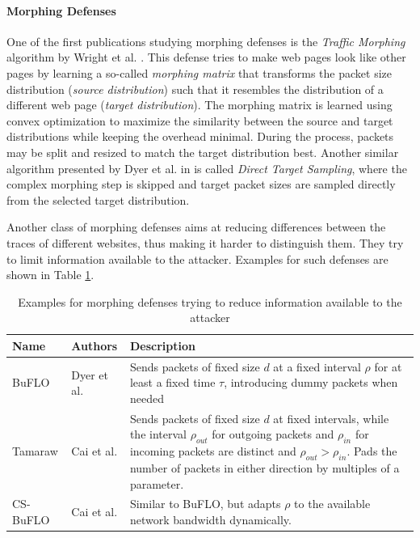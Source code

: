 \documentclass[
	ruledheaders=chapter,
	class=report,
	thesis={type=master, department=inf},
	accentcolor=1c,
	custommargins=true,
	marginpar=false,
	parskip=half-,
	fontsize=11pt,
]{tudapub}
\begin{document}
	\paragraph{Morphing Defenses} One of the first publications studying morphing defenses is the \textit{Traffic Morphing} algorithm by Wright et al. \cite{Wright2009}. This defense tries to make web pages look like other pages by learning a so-called \textit{morphing matrix} that transforms the packet size distribution (\textit{source distribution}) such that it resembles the distribution of a different web page (\textit{target distribution}). The morphing matrix is learned using convex optimization to maximize the similarity between the source and target distributions while keeping the overhead minimal. During the process, packets may be split and resized to match the target distribution best. Another similar algorithm presented by Dyer et al. in \cite{Dyer2012} is called \textit{Direct Target Sampling}, where the complex morphing step is skipped and target packet sizes are sampled directly from the selected target distribution.
	
	Another class of morphing defenses aims at reducing differences between the traces of different websites, thus making it harder to distinguish them. They try to limit information available to the attacker. Examples for such defenses are shown in Table \ref{tbl:morphing}.
	
	\begin{table}
		\centering
		\begin{tabularx}{\textwidth}{llX}
			\toprule \textbf{Name} & \textbf{Authors} & \textbf{Description} \\
			\midrule BuFLO & Dyer et al. \cite{Dyer2012} & Sends packets of fixed size $d$ at a fixed interval $\rho$ for at least a fixed time $\tau$, introducing dummy packets when needed \\
			Tamaraw & Cai et al. \cite{Cai2014} & Sends packets of fixed size $d$ at fixed intervals, while the interval $\rho_{out}$ for outgoing packets and $\rho_{in}$ for incoming packets are distinct and $\rho_{out} > \rho_{in}$. Pads the number of packets in either direction by multiples of a parameter. \cite{Cherubin2017} \\
			CS-BuFLO & Cai et al. \cite{Cai2014a} & Similar to BuFLO, but adapts $\rho$ to the available network bandwidth dynamically. \\
			\bottomrule
		\end{tabularx}
		\caption{Examples for morphing defenses trying to reduce information available to the attacker}
		\label{tbl:morphing}
	\end{table}
			
\end{document}
